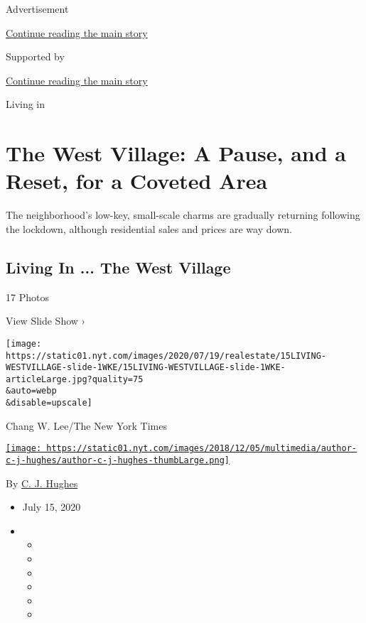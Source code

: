 Advertisement

\protect\hyperlink{after-top}{Continue reading the main story}

Supported by

\protect\hyperlink{after-sponsor}{Continue reading the main story}

Living in

\hypertarget{the-west-village-a-pause-and-a-reset-for-a-coveted-area}{%
\section{The West Village: A Pause, and a Reset, for a Coveted
Area}\label{the-west-village-a-pause-and-a-reset-for-a-coveted-area}}

The neighborhood's low-key, small-scale charms are gradually returning
following the lockdown, although residential sales and prices are way
down.

\href{https://www.nytimes.com/slideshow/2020/07/15/realestate/living-in-the-west-village.html}{}

\hypertarget{living-in--the-west-village}{%
\subsection{Living In ... The West
Village}\label{living-in--the-west-village}}

17 Photos

View Slide Show ›

\texttt{[image: https://static01.nyt.com/images/2020/07/19/realestate/15LIVING-WESTVILLAGE-slide-1WKE/15LIVING-WESTVILLAGE-slide-1WKE-articleLarge.jpg?quality=75\\\&auto=webp\\\&disable=upscale]}

Chang W. Lee/The New York Times

\href{https://www.nytimes.com/by/c-j-hughes}{\texttt{[image: https://static01.nyt.com/images/2018/12/05/multimedia/author-c-j-hughes/author-c-j-hughes-thumbLarge.png]}}

By \href{https://www.nytimes.com/by/c-j-hughes}{C. J. Hughes}

\begin{itemize}
\item
  July 15, 2020
\item
  \begin{itemize}
  \item
  \item
  \item
  \item
  \item
  \item
  \end{itemize}
\end{itemize}

